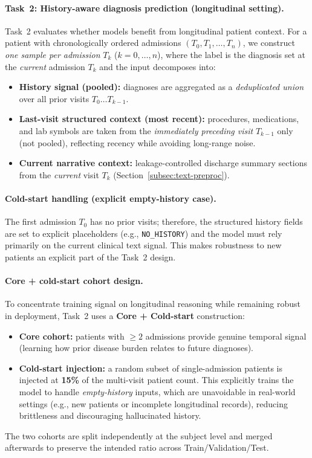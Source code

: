 \paragraph{Task~2: History-aware diagnosis prediction (longitudinal setting).}
Task~2 evaluates whether models benefit from longitudinal patient context. For a patient with chronologically ordered admissions $(T_0, T_1, \dots, T_n)$, we construct \emph{one sample per admission} $T_k$ ($k=0,\dots,n$), where the label is the diagnosis set at the \emph{current} admission $T_k$ and the input decomposes into:
\begin{itemize}
    \item \textbf{History signal (pooled):} diagnoses are aggregated as a \emph{deduplicated union} over all prior visits $T_0 \dots T_{k-1}$.
    \item \textbf{Last-visit structured context (most recent):} procedures, medications, and lab symbols are taken from the \emph{immediately preceding visit} $T_{k-1}$ only (not pooled), reflecting recency while avoiding long-range noise.
    \item \textbf{Current narrative context:} leakage-controlled discharge summary sections from the \emph{current} visit $T_k$ (Section~\ref{subsec:text-preproc}).
\end{itemize}

\paragraph{Cold-start handling (explicit empty-history case).}
The first admission $T_0$ has no prior visits; therefore, the structured history fields are set to explicit placeholders (e.g., \texttt{NO\_HISTORY}) and the model must rely primarily on the current clinical text signal. This makes robustness to new patients an explicit part of the Task~2 design.

\paragraph{Core + cold-start cohort design.}
To concentrate training signal on longitudinal reasoning while remaining robust in deployment, Task~2 uses a \textbf{Core + Cold-start} construction:
\begin{itemize}
    \item \textbf{Core cohort:} patients with $\ge 2$ admissions provide genuine temporal signal (learning how prior disease burden relates to future diagnoses).
    \item \textbf{Cold-start injection:} a random subset of single-admission patients is injected at \textbf{15\%} of the multi-visit patient count. This explicitly trains the model to handle \emph{empty-history} inputs, which are unavoidable in real-world settings (e.g., new patients or incomplete longitudinal records), reducing brittleness and discouraging hallucinated history.
\end{itemize}
The two cohorts are split independently at the subject level and merged afterwards to preserve the intended ratio across Train/Validation/Test.

